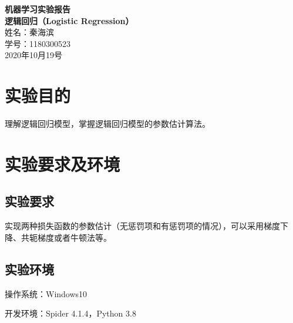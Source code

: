 \documentclass[12pt]{article}
\begin{document}
 
\begin{titlepage}
\begin{center}      
{\Huge \bfseries 机器学习实验报告}\\[1cm]
{\Large \bfseries 逻辑回归（Logistic Regression）}\\[10cm]
{\Large 姓名：秦海滨}\\[1cm]
{\Large 学号：1180300523}\\[8cm]
{\Large 2020年10月19号}
\end{center}
\end{titlepage}
\newpage
\tableofcontents
\newpage
\section{实验目的}
理解逻辑回归模型，掌握逻辑回归模型的参数估计算法。
\section{实验要求及环境}
\subsection{实验要求}
实现两种损失函数的参数估计（无惩罚项和有惩罚项的情况），可以采用梯度下降、共轭梯度或者牛顿法等。
\subsection{实验环境}
\noindent 操作系统：Windows10 \par
\noindent 开发环境：Spider 4.1.4，Python 3.8 \par
\end{document}
